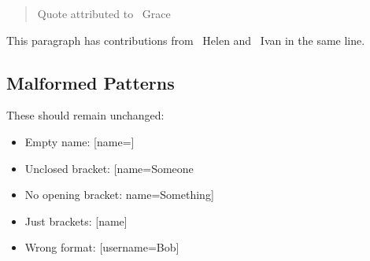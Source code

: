 \begin{quote}
Quote attributed to {\small \faUser\ Grace}
\end{quote}

This paragraph has contributions from {\small \faUser\ Helen} and
{\small \faUser\ Ivan} in the same line.

\subsection{Malformed Patterns}\label{malformed-patterns}

These should remain unchanged:

\begin{itemize}
\tightlist
\item
  Empty name: {[}name={]}
\item
  Unclosed bracket: {[}name=Someone
\item
  No opening bracket: name=Something{]}
\item
  Just brackets: {[}name{]}
\item
  Wrong format: {[}username=Bob{]}
\end{itemize}
